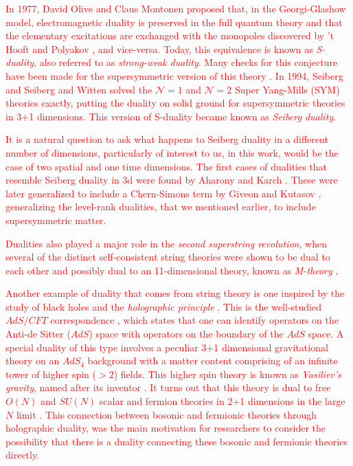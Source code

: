 \textcolor{red}{In 1977, David Olive and Claus Montonen \cite{Montonen:1977sn} proposed that, in the Georgi-Glashow model, electromagnetic duality is preserved in the full quantum theory and that the elementary excitations are exchanged with the monopoles discovered by 't Hooft and Polyakov \cite{Polyakov:1974ek, tHooft:1974kcl}, and vice-versa. Today, this equivalence is known as \textit{S-duality}, also referred to as \textit{strong-weak duality}. Many checks for this conjecture have been made for the supersymmetric version of this theory \cite{Osborn:1979tq, Witten:1978mh, Sen:1994yi, Vafa:1994tf}. In 1994, Seiberg \cite{Seiberg:1994bz} and Seiberg and Witten \cite{Seiberg:1994rs} solved the $\mathcal{N}=1$ and $\mathcal{N}=2$ Super Yang-Mills (SYM) theories exactly, putting the duality on solid ground for supersymmetric theories in 3+1 dimensions. This version of S-duality became known as \textit{Seiberg duality}.}

\textcolor{red}{It is a natural question to ask what happens to Seiberg duality in a different number of dimensions, particularly of interest to us, in this work, would be the case of two spatial and one time dimensions. The first cases of dualities that resemble Seiberg duality in 3d were found by Aharony and Karch \cite{Aharony:1997gp, Karch:1997ux}. These were later generalized to include a Chern-Simons term by Giveon and Kutasov \cite{Giveon:2008zn}, generalizing the level-rank dualities, that we mentioned earlier, to include supersymmetric matter. }

\textcolor{red}{Dualities also played a major role in the \textit{second superstring revolution}, when several of the distinct self-consistent string theories were shown to be dual to each other \cite{Sen:1994fa, Schwarz:1994xn, Sathiapalan:1986zb, Hull:1994ys} and possibly dual to an 11-dimensional theory, known as \textit{M-theory} \cite{Witten:1995ex}.}

\textcolor{red}{Another example of duality that comes from string theory is one inspired by the study of black holes and the \textit{holographic principle} \cite{Susskind:1994vu, tHooft:1993dmi}. This is the well-studied $AdS/CFT$ correspondence \cite{Aharony:1999ti, Maldacena:1997re}, which states that one can identify operators on the Anti-de Sitter ($AdS$) space with operators on the boundary of the $AdS$ space. A special duality of this type involves a peculiar 3+1 dimensional gravitational theory on an $AdS_4$ background with a matter content comprising of an infinite tower of higher spin ($>2$) fields. This higher spin theory is known as \textit{Vasiliev's gravity}, named after its inventor \cite{Vasiliev:1992av}. It turns out that this theory is dual to free $O(N)$ and $SU(N)$ scalar and fermion theories in 2+1 dimensions in the large $N$ limit \cite{Sezgin:2003pt, Klebanov:2002ja}. This connection between bosonic and fermionic theories through holographic duality, was the main motivation for researchers to consider the possibility that there is a duality connecting these bosonic and fermionic theories directly. }


